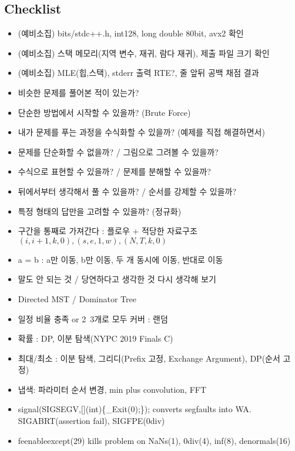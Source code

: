 \documentclass[landscape, 8pt, a4paper, oneside]{extarticle}
\begin{document}
\begin{multicols*}{3}
\subsection{Checklist}
\begin{itemize}[noitemsep]
    \item (예비소집) bits/stdc++.h, int128, long double 80bit, avx2 확인
    \item (예비소집) 스택 메모리(지역 변수, 재귀, 람다 재귀), 제출 파일 크기 확인
    \item (예비소집) MLE(힙,스택), stderr 출력 RTE?, 줄 앞뒤 공백 채점 결과
    \item 비슷한 문제를 풀어본 적이 있는가?
    \item 단순한 방법에서 시작할 수 있을까? (Brute Force)
    \item 내가 문제를 푸는 과정을 수식화할 수 있을까? (예제를 직접 해결하면서)
    \item 문제를 단순화할 수 없을까? / 그림으로 그려볼 수 있을까?
    \item 수식으로 표현할 수 있을까? / 문제를 분해할 수 있을까?
    \item 뒤에서부터 생각해서 풀 수 있을까? / 순서를 강제할 수 있을까?
    \item 특정 형태의 답만을 고려할 수 있을까? (정규화)
    \item 구간을 통째로 가져간다 : 플로우 + 적당한 자료구조\\$(i,i+1,k,0),(s,e,1,w),(N,T,k,0)$
    \item a = b : a만 이동, b만 이동, 두 개 동시에 이동, 반대로 이동
    \item 말도 안 되는 것 / 당연하다고 생각한 것 다시 생각해 보기
    \item Directed MST / Dominator Tree
    \item 일정 비율 충족 or 2~3개로 모두 커버 : 랜덤
    \item 확률 : DP, 이분 탐색(NYPC 2019 Finals C)
    \item 최대/최소 : 이분 탐색, 그리디(Prefix 고정, Exchange Argument), DP(순서 고정)
    \item 냅색: 파라미터 순서 변경, min plus convolution, FFT
    \item signal(SIGSEGV,[](int)\{\_Exit(0);\}); converts segfaults into WA. SIGABRT(assertion fail), SIGFPE(0div)
    \item feenableexcept(29) kills problem on NaNs(1), 0div(4), inf(8), denormals(16)
\end{itemize}

\end{multicols*}
\end{document}
